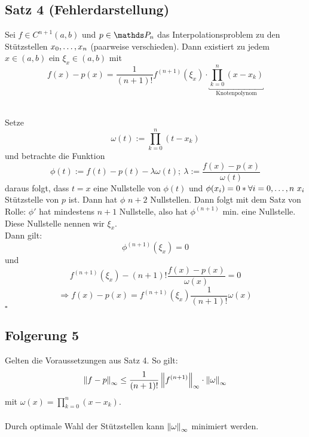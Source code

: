 \subsection{Satz 4 (Fehlerdarstellung)}
\label{sub:satz_4}
Sei $f\in C^{n+1}(a,b)$ und $p\in \Pw_n$ das Interpolationsproblem zu den Stützstellen $x_0, \dots ,x_n$ (paarweise verschieden). 
Dann existiert zu jedem $x\in (a,b)$ ein $\xi_x\in (a,b)$ mit
\[
f(x)-p(x)= \frac{1}{(n+1)!}f^{(n+1)}(\xi_x)\cdot \underbracket{\prod_{k=0}^{n}(x-x_k) }_{\text{Knotenpolynom}}\tag{$\ast$}
\]

\\
Setze
\[
\omega(t):= \prod_{k=0}^{n} (t-x_k)
\]
und betrachte die Funktion
\[
\phi(t):= f(t)-p(t)-\lambda\omega(t);~ \lambda:= \frac{f(x)-p(x)}{\omega(t)}
\]
daraus folgt, dass $t=x$ eine Nullstelle von $\phi(t)$ und $\phi(x_i)=0*\forall i=0, \dots ,n~x_i$ Stützstelle von $p$ ist.
Dann hat $\phi$ $n+2$ Nullstellen.
Dann folgt mit dem Satz von Rolle: $\phi'$ hat mindestens $n+1$ Nullstelle, also hat $\phi^{(n+1)}$ min. eine Nullstelle.
Diese Nullstelle nennen wir $\xi_x$.\\
Dann gilt:
\[
\phi^{(n+1)}(\xi_x)=0
\]
und 
\[
f^{(n+1)}(\xi_x)-(n+1)! \frac{f(x)-p(x)}{\omega(x)}=0
\]
\[
\Rightarrow f(x)-p(x)=f^{(n+1)}(\xi_x)\frac{1}{(n+1)!}\omega(x)
\]
\hfill $\square$

\subsection{Folgerung 5}
\label{sub:folgerung_5}
Gelten die Voraussetzungen aus Satz 4.
So gilt:
\[
\norm{f-p}_\infty\le \frac{1}{(n+1)!}\norm{f^{(n+1)}}_\infty\cdot\norm{\omega}_\infty
\]
mit $\omega(x)=\prod_{k=0}^{n}(x-x_k)$.\\

\\
Durch optimale Wahl der Stützstellen kann $\norm{\omega}_\infty$ minimiert werden.

